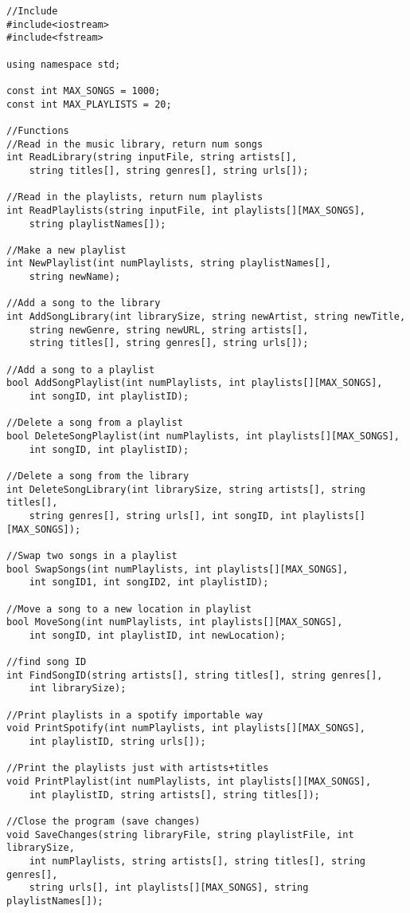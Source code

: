 \begin{verbatim}
//Include
#include<iostream>
#include<fstream>

using namespace std;

const int MAX_SONGS = 1000;
const int MAX_PLAYLISTS = 20;

//Functions
//Read in the music library, return num songs
int ReadLibrary(string inputFile, string artists[], 
    string titles[], string genres[], string urls[]);

//Read in the playlists, return num playlists
int ReadPlaylists(string inputFile, int playlists[][MAX_SONGS], 
    string playlistNames[]);

//Make a new playlist
int NewPlaylist(int numPlaylists, string playlistNames[], 
    string newName);

//Add a song to the library
int AddSongLibrary(int librarySize, string newArtist, string newTitle, 
    string newGenre, string newURL, string artists[], 
    string titles[], string genres[], string urls[]);

//Add a song to a playlist
bool AddSongPlaylist(int numPlaylists, int playlists[][MAX_SONGS],
    int songID, int playlistID);

//Delete a song from a playlist
bool DeleteSongPlaylist(int numPlaylists, int playlists[][MAX_SONGS], 
    int songID, int playlistID);

//Delete a song from the library
int DeleteSongLibrary(int librarySize, string artists[], string titles[], 
    string genres[], string urls[], int songID, int playlists[][MAX_SONGS]);

//Swap two songs in a playlist
bool SwapSongs(int numPlaylists, int playlists[][MAX_SONGS], 
    int songID1, int songID2, int playlistID);

//Move a song to a new location in playlist
bool MoveSong(int numPlaylists, int playlists[][MAX_SONGS], 
    int songID, int playlistID, int newLocation);

//find song ID
int FindSongID(string artists[], string titles[], string genres[],
    int librarySize);

//Print playlists in a spotify importable way
void PrintSpotify(int numPlaylists, int playlists[][MAX_SONGS], 
    int playlistID, string urls[]);

//Print the playlists just with artists+titles
void PrintPlaylist(int numPlaylists, int playlists[][MAX_SONGS], 
    int playlistID, string artists[], string titles[]);

//Close the program (save changes)
void SaveChanges(string libraryFile, string playlistFile, int librarySize, 
    int numPlaylists, string artists[], string titles[], string genres[], 
    string urls[], int playlists[][MAX_SONGS], string playlistNames[]);

\end{verbatim}

